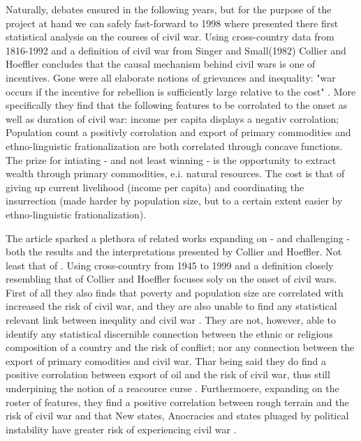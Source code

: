 Naturally, debates ensured in the following years, but for the purpose of the project at hand we can safely fast-forward to 1998 where \cite{Collier_Hoeffler_1998} presented there first statistical analysis on the courses of civil war. Using cross-country data from 1816-1992 and a definition of civil war from Singer and Small(1982) Collier and Hoeffler concludes that the causal mechanism behind civil wars is one of incentives. Gone were all elaborate notions of grievances and inequality: "war occurs if the incentive for rebellion is sufficiently large relative to the cost" \citep[563-567]{Collier_Hoeffler_1998}. More specifically they find that the following features to be corrolated to the onset as well as duration of civil war: income per capita displays a negativ corrolation; Population count a positivly corrolation and export of primary commodities and ethno-linguistic frationalization are both correlated through concave functions. The prize for intiating - and not least winning - is the opportunity to extract wealth through primary commodities, e.i. natural resources. The cost is that of giving up current livelihood (income per capita) and coordinating the insurrection (made harder by population size, but to a certain extent easier by ethno-linguistic frationalization)\citep[565-570]{Collier_Hoeffler_1998}.\par

The article sparked a plethora of related works expanding on - and challenging - both the results and the interpretations presented by Collier and Hoeffler. Not least that of \cite{Fearon_Laitin_2003}. Using cross-country from 1945 to 1999 and a definition closely resembling that of Collier and Hoeffler focuses soly on the onset of civil wars\citep[76]{Fearon_Laitin_2003}. First of all they also finds that poverty and population size are correlated with increased the risk of civil war, and they are also unable to find any statistical relevant link between inequlity and civil war \citep[83-85]{Fearon_Laitin_2003}. They are not, however, able to identify any statistical discernible connection between the ethnic or religious composition of a country and the risk of conflict; nor any connection between the export of primary comodities and civil war. Thar being said they do find a positive corrolation between export of oil and the risk of civil war, thus still underpining the notion of a reacource curse \citep[85-87]{Fearon_Laitin_2003}. Furthermoere, expanding on the roster of features, they find a positive correlation between rough terrain and the risk of civil war and that New states, Anocracies and states pluaged by political instability have greater risk of experiencing civil war  \citep[85]{Fearon_Laitin_2003}.\par

